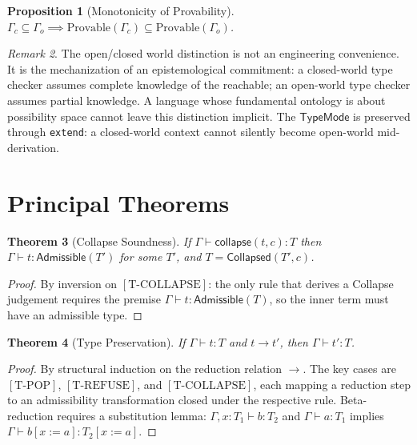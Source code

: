 \documentclass[12pt, a4paper, openany]{book}
\theoremstyle{plain}
\newtheorem{theorem}{Theorem}[chapter]
\newtheorem{proposition}[theorem]{Proposition}
\theoremstyle{definition}
\theoremstyle{remark}
\newtheorem{remark}[theorem]{Remark}
\newcommand{\Adm}{\mathsf{Admissible}}
\newcommand{\Col}{\mathsf{Collapsed}}
\begin{document}
\begin{proposition}[Monotonicity of Provability]
$\Gamma_c \subseteq \Gamma_o \implies \mathrm{Provable}(\Gamma_c) \subseteq
\mathrm{Provable}(\Gamma_o)$.
\end{proposition}

\begin{remark}
The open/closed world distinction is not an engineering convenience. It is the
mechanization of an epistemological commitment: a closed-world type checker assumes
complete knowledge of the reachable; an open-world type checker assumes partial
knowledge. A language whose fundamental ontology is about possibility space cannot
leave this distinction implicit. The $\mathsf{TypeMode}$ is preserved through
\texttt{extend}: a closed-world context cannot silently become open-world
mid-derivation.
\end{remark}

\section{Principal Theorems}

\begin{theorem}[Collapse Soundness]
If $\Gamma \vdash \mathsf{collapse}(t, c) : T$ then $\Gamma \vdash t : \Adm(T')$
for some $T'$, and $T = \Col(T', c)$.
\end{theorem}

\begin{proof}
By inversion on $[\mathrm{T\text{-}COLLAPSE}]$: the only rule that derives a
Collapse judgement requires the premise $\Gamma \vdash t : \Adm(T)$, so the
inner term must have an admissible type.
\end{proof}

\begin{theorem}[Type Preservation]
If $\Gamma \vdash t : T$ and $t \to t'$, then $\Gamma \vdash t' : T$.
\end{theorem}

\begin{proof}
By structural induction on the reduction relation $\to$. The key cases are
$[\mathrm{T\text{-}POP}]$, $[\mathrm{T\text{-}REFUSE}]$, and
$[\mathrm{T\text{-}COLLAPSE}]$, each mapping a reduction step to an admissibility
transformation closed under the respective rule. Beta-reduction requires a
substitution lemma: $\Gamma, x : T_1 \vdash b : T_2$ and $\Gamma \vdash a : T_1$
implies $\Gamma \vdash b[x := a] : T_2[x := a]$.
\end{proof}
\end{document}
